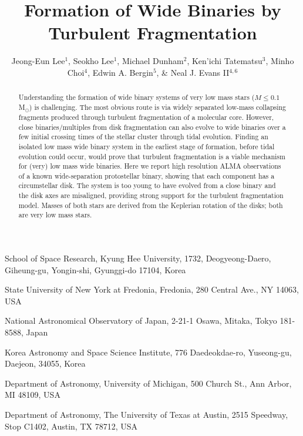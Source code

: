 \documentclass{nature}
\title{Formation of Wide Binaries by Turbulent Fragmentation}
\author{Jeong-Eun Lee$^{1}$, Seokho Lee$^1$, Michael Dunham$^{2}$, Ken'ichi Tatematsu$^{3}$, Minho Choi$^4$, Edwin A. Bergin$^5$,
\& Neal J. Evans II$^{4,6}$ }
\newcommand{\msun}{\mbox{M$_\odot$}}%
\begin{document}
\maketitle

\begin{affiliations}
 \item School of Space Research, Kyung Hee University, 1732, Deogyeong-Daero, Giheung-gu, Yongin-shi, Gyunggi-do 17104, Korea
 \item State University of New York at Fredonia, Fredonia, 280 Central Ave., NY 14063, USA
 \item National Astronomical Observatory of Japan, 2-21-1 Osawa, Mitaka, Tokyo 181-8588, Japan
\item Korea Astronomy and Space Science Institute, 776 Daedeokdae-ro, Yuseong-gu, Daejeon, 34055,  Korea
 \item Department of Astronomy, University of Michigan, 500 Church St., Ann
Arbor, MI 48109, USA
  \item Department of Astronomy, The University of Texas at Austin, 
   2515 Speedway, Stop C1402, Austin, TX 78712, USA

 \end{affiliations}


\begin{abstract}
Understanding the formation of  wide binary systems of very low mass stars ($M\le 0.1$ \msun)
is challenging\cite{Bejar2008,Luhman2009,Luhman2012}.
The most obvious route is via widely separated low-mass collapsing fragments produced 
through turbulent fragmentation of a molecular core\cite{Goodwin2004, Fisher2004}. 
However, close binaries/multiples from disk fragmentation can also evolve to wide binaries
over a few initial crossing times of the stellar cluster through tidal evolution\cite{Marks2012}.
Finding an isolated low mass wide binary system in the earliest stage of formation, before tidal evolution could 
 occur,
would prove that  turbulent fragmentation is a viable mechanism for (very) low mass wide binaries. 
Here we report high resolution ALMA observations of a known wide-separation protostellar binary, showing that each component has a circumstellar disk.
The system is too young\cite{Dunham2006} to have evolved from a close binary and the disk axes are misaligned, providing strong support for the turbulent
fragmentation model. Masses of both stars are derived from the Keplerian
rotation of the disks; both are very low mass stars.

\end{abstract}
\end{document}
